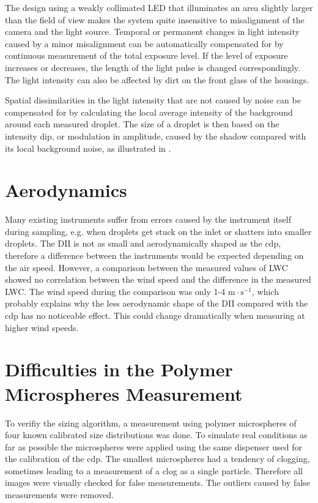 The design using a weakly collimated LED that illuminates an area slightly larger than the field of view makes the system quite insensitive to misalignment of the camera and the light source. Temporal or permanent changes in light intensity caused by a minor misalignment can be automatically compensated for by continuous measurement of the total exposure level. If the level of exposure increases or decreases, the length of the light pulse is changed correspondingly. The light intensity can also be affected by dirt on the front glass of the housings. 

Spatial dissimilarities in the light intensity that are not caused by noise can be compensated for by calculating the local average intensity of the background around each measured droplet. The size of a droplet is then based on the intensity dip, or modulation in amplitude, caused by the shadow compared with its local background noise, as illustrated in .

\section{Aerodynamics}

Many existing instruments suffer from errors caused by the instrument itself during sampling, e.g. when droplets get stuck on the inlet or shatters into smaller droplets. The DII is not as small and aerodynamically shaped as the \gls{cdp}, therefore a difference between the instruments would be expected depending on the air speed. However, a comparison between the measured values of LWC showed no correlation between the wind speed and the difference in the measured LWC. The wind speed during the comparison was only 1-4 $\mathrm{m \cdot s^{-1}}$, which probably explains why the less aerodynamic shape of the DII compared with the \gls{cdp} has no noticeable effect. This could change dramatically when measuring at higher wind speeds.

\section{Difficulties in the Polymer Microspheres Measurement}

To verifiy the sizing algorithm, a measurement using polymer microspheres of four known calibrated size distributions was done. To simulate real conditions as far as possible the microspheres were applied using the same dispenser used for the calibration of the \gls{cdp}. The smallest microspheres had a tendency of clogging, sometimes leading to a measurement of a clog as a single particle. Therefore all images were visually checked for false measurements. The outliers caused by false measurements were removed.

